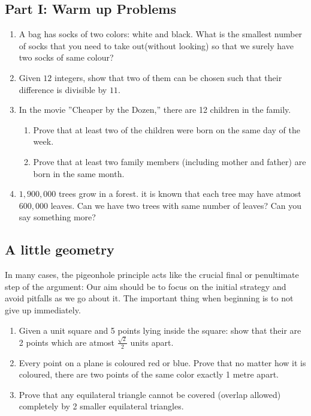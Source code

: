\documentclass{amsart}
\begin{document}
\subsection{Part I: Warm up Problems}

\begin{enumerate}
\item A bag has socks of two colors: white and black. What is the smallest number of socks that you need to take out(without looking) so that we surely have two socks of same colour?
\item Given $12$ integers, show that two of them can be chosen such that their difference is divisible by $11$.
\item In the movie ”Cheaper by the Dozen,” there are 12 children in the family.
	\begin{enumerate}
\item Prove that at least two of the children were born on the same day of the week.
\item Prove that at least two family members (including mother and father) are born in the same month.
\end{enumerate}
\item $1,900,000$ trees grow in a forest. it is known that each tree may have atmost $600,000$ leaves. Can we have two trees with same number of leaves? Can you say something more? 

\end{enumerate}

\subsection{A little geometry}
In many cases, the pigeonhole principle acts like the crucial final or penultimate step of the argument: Our aim should be to focus on the initial strategy and avoid pitfalls as we go about it. The important thing when beginning is to not give up immediately. 
\begin{enumerate}
\item Given a unit square and 5 points lying inside the square: show that their are 2 points which are atmost $\frac{\sqrt{2}}{2}$ units apart.
\item Every point on a plane is coloured red or blue. Prove that no matter how it is coloured, there are two points of the same color exactly 1 metre apart.
\item Prove that any equilateral triangle cannot be covered (overlap allowed) completely by 2 smaller equilateral triangles.
\end{enumerate}
\end{document}
